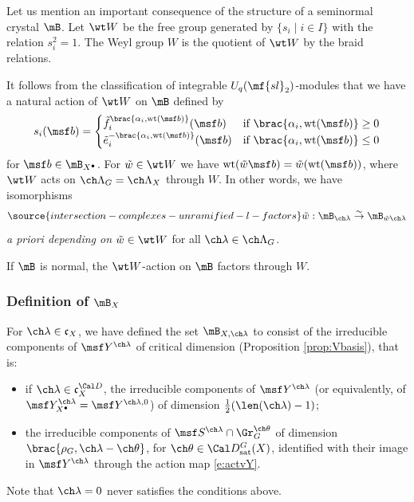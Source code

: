 \subsubsection{} \label{sect:crysW}
Let us mention an important consequence of the structure of a seminormal crystal $\mB$.
Let $\wt W$ be the free group generated by $\{ s_i \mid i \in I \}$ with
the relation $s_i^2= 1$.
The Weyl group $W$ is the quotient of $\wt W$ by the braid
relations.

It follows from the classification of integrable $U_q(\mf{sl}_2)$-modules that
we have a natural action of $\wt W$ on $\mB$ defined by
\[
s_i(\msf b) = \begin{cases}
    \tilde f_i^{\brac{\alpha_i, \mathrm{wt}(\msf b)}}(\msf b) &\text{if }
    \brac{\alpha_i,\mathrm{wt}(\msf b)} \ge 0 \\
    \tilde e_i^{-\brac{\alpha_i, \mathrm{wt}(\msf b)}}(\msf b) &\text{if }
    \brac{\alpha_i,\mathrm{wt}(\msf b)} \le 0
\end{cases}
\]
for $\msf b\in \mB_{X^\bullet}$.
For $\tilde w\in \wt W$ we have $\mathrm{wt}(\tilde w \msf b) = \tilde w (\mathrm{wt}(\msf b))$,
where $\wt W$ acts on $\ch\Lambda_G=\ch\Lambda_X$ through $W$.
In other words, we have isomorphisms
\begin{equation} \label{e:crysW}
\source{intersection-complexes-unramified-l-factors}
 \tilde w: \mB_{\ch\lambda} \overset\sim\to \mB_{\tilde w \ch\lambda}
\end{equation}
\emph{a priori depending on} $\tilde w \in \wt W$ for all $\ch\lambda\in\ch\Lambda_G$.

If $\mB$ is normal, the $\wt W$-action on $\mB$ factors through $W$.


\subsubsection{Definition of $\mB_X$}\label{sect:defcrys}

For $\ch\lambda \in \mathfrak c_X$, we have defined the set
$\mB_{X,\ch\lambda}$ to consist of
the irreducible components of $\msf Y^{\ch\lambda}$ of critical dimension (Proposition \ref{prop:Vbasis}), that is:
\begin{itemize}
 \item if $\ch\lambda\in\mathfrak c^{\Cal D}_X$, the irreducible components of $\msf Y^{\ch\lambda}$ (or equivalently, of $\msf Y_{X^\bullet}^{\ch\lambda} = \msf Y^{\ch\lambda,0}$) of dimension
$\frac 1 2 (\len(\ch\lambda)-1)$;
 \item the irreducible components of $\msf S^{\ch\lambda} \cap \Gr_G^{\ch\theta}$
of dimension $\brac{\rho_G,\ch\lambda-\ch\theta}$, for $\ch\theta \in \Cal D^G_{\mathrm{sat}}(X)$, identified with their image in $\msf Y^{\ch\lambda}$ through the action map \eqref{e:actvY}.
\end{itemize}
Note that $\ch\lambda=0$ never satisfies the conditions above.

